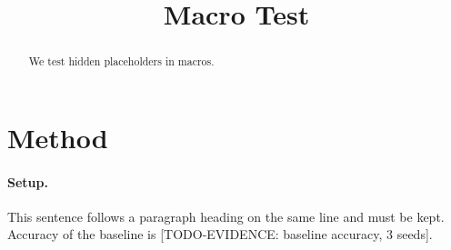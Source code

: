 \documentclass{article}
\newcommand{\todo}[1]{{\color{red}[TODO-EVIDENCE: #1]}}
\begin{document}
\title{Macro Test}
\maketitle
\begin{abstract}
We test hidden placeholders in macros.
\end{abstract}
\section{Method}
\paragraph{Setup.} This sentence follows a paragraph heading on the same line and must be kept.
Accuracy of the baseline is \todo{baseline accuracy, 3 seeds}.
\end{document}
